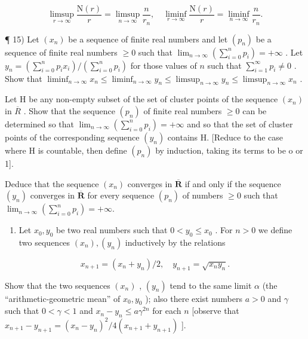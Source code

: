 \[
\limsup _ {r \to \infty} \frac {\mathrm{N} (r)}{r} = \limsup _ {n \to \infty} \frac {n}{r _ {n}}, \quad \liminf _ {r \to \infty} \frac {\mathrm{N} (r)}{r} = \liminf _ {n \to \infty} \frac {n}{r _ {n}}.
\]

¶ 15) Let \((x_n)\) be a sequence of finite real numbers and let \((p_n)\) be a sequence of finite real numbers \(\geqslant 0\) such that \(\lim_{n\to \infty}\left(\sum_{i=0}^{n}p_i\right) = +\infty\) . Let \(y_n = \left(\sum_{i=0}^{n}p_ix_i\right) / \left(\sum_{i=0}^{n}p_i\right)\) for those values of \(n\) such that \(\sum_{i=1}^{\infty}p_i \neq 0\) . Show that \(\liminf_{n\to \infty}x_n \leqslant \liminf_{n\to \infty}y_n \leqslant \limsup_{n\to \infty}y_n \leqslant \limsup_{n\to \infty}x_n\) .

Let H be any non-empty subset of the set of cluster points of the sequence \((x_{n})\) in \(\overline{R}\) . Show that the sequence \((p_{n})\) of finite real numbers \(\geqslant0\) can be determined so that \(\lim_{n\to\infty}\left(\sum_{i=0}^{n}p_{i}\right)=+\infty\) and so that the set of cluster points of the corresponding sequence \((y_{n})\) contains H. {[}Reduce to the case where H is countable, then define \((p_{n})\) by induction, taking its terms to be o or 1{]}.

Deduce that the sequence \((x_{n})\) converges in \(\overline{\mathbf{R}}\) if and only if the sequence \((y_{n})\) converges in \(\overline{\mathbf{R}}\) for every sequence \((p_n)\) of numbers \(\geqslant 0\) such that \(\lim_{n\to \infty}\left(\sum_{i = 0}^{n}p_i\right) = +\infty .\)

\begin{enumerate}
\def\labelenumi{\arabic{enumi})}
\setcounter{enumi}{15}
\tightlist
\item
  Let \(x_0, y_0\) be two real numbers such that \(0 < y_0 \leqslant x_0\) . For \(n > 0\) we define two sequences \((x_n), (y_n)\) inductively by the relations
\end{enumerate}

\[
x _ {n + 1} = \left(x _ {n} + y _ {n}\right) / 2, \quad y _ {n + 1} = \sqrt {x _ {n} y _ {n}}.
\]

Show that the two sequences \((x_{n})\) , \((y_{n})\) tend to the same limit \(\alpha\) (the ``arithmetic-geometric mean'' of \(x_{0}, y_{0}\) ); also there exist numbers \(a > 0\) and \(\gamma\) such that \(0 < \gamma < 1\) and \(x_{n} - y_{n} \leqslant a\gamma^{2n}\) for each \(n\) {[}observe that \(x_{n+1} - y_{n+1} = (x_{n} - y_{n})^{2}/4(x_{n+1} + y_{n+1})\) {]}.

